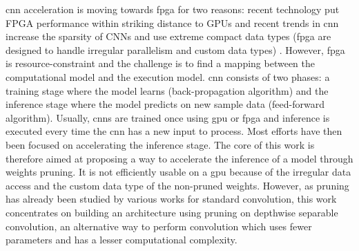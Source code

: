 %
\acrshort{cnn} acceleration is moving towards \acrshort{fpga} for two reasons: recent technology put FPGA performance within striking distance to GPUs and recent trends in \acrshort{cnn} increase the sparsity of CNNs and use extreme compact data types (\acrshort{fpga} are designed to handle irregular parallelism and custom data types) \cite{abdelouahab_accelerating_2018}. However, \acrshort{fpga} is resource-constraint and the challenge is to find a mapping between the computational model and the execution model. \newline \newline
%
\acrshort{cnn} consists of two phases: a training stage where the model learns (back-propagation algorithm) and the inference stage where the model predicts on new sample data (feed-forward algorithm). Usually, \acrshort{cnn}s are trained once using \acrshort{gpu} or \acrshort{fpga} and inference is executed every time the \acrshort{cnn} has a new input to process. Most efforts have then been focused on accelerating the inference stage. The core of this work is therefore aimed at proposing a way to accelerate the inference of a model through weights pruning. It is not efficiently usable on a \acrshort{gpu} because of the irregular data access and the custom data type of the non-pruned weights. \newline \newline
%
However, as pruning has already been studied by various works for standard convolution, this work concentrates on building an architecture using pruning on depthwise separable convolution, an alternative way to perform convolution which uses fewer parameters and has a lesser computational complexity.
%
